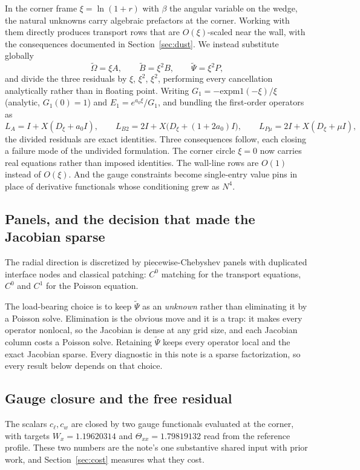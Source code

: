 \documentclass[11pt]{article}
\begin{document}
In the corner frame $\xi = \ln(1+r)$ with $\beta$ the angular variable on the wedge,
the natural unknowns carry algebraic prefactors at the corner. Working with them
directly produces transport rows that are $O(\xi)$-scaled near the wall, with the
consequences documented in Section~\ref{sec:dust}. We instead substitute globally
\[
  \tilde\Omega = \xi A, \qquad \tilde B = \xi^2 B, \qquad \tilde\Psi = \xi^2 P,
\]
and divide the three residuals by $\xi$, $\xi^2$, $\xi^2$, performing every
cancellation analytically rather than in floating point. Writing
$G_1 = -\mathrm{expm1}(-\xi)/\xi$ (analytic, $G_1(0) = 1$) and $E_1 = e^{a_0\xi}/G_1$,
and bundling the first-order operators as
\[
  L_A = I + X(D_\xi + a_0 I), \qquad
  L_{B2} = 2I + X\bigl(D_\xi + (1+2a_0)I\bigr), \qquad
  L_{P\mu} = 2I + X(D_\xi + \mu I),
\]
the divided residuals are exact identities. Three consequences follow, each closing a
failure mode of the undivided formulation. The corner circle $\xi = 0$ now carries real
equations rather than imposed identities. The wall-line rows are $O(1)$ instead of
$O(\xi)$. And the gauge constraints become single-entry value pins in place of
derivative functionals whose conditioning grew as $N^4$.

\subsection{Panels, and the decision that made the Jacobian sparse}

The radial direction is discretized by piecewise-Chebyshev panels with duplicated
interface nodes and classical patching: $C^0$ matching for the transport equations,
$C^0$ and $C^1$ for the Poisson equation.

The load-bearing choice is to keep $\tilde\Psi$ as an \emph{unknown} rather than
eliminating it by a Poisson solve. Elimination is the obvious move and it is a trap: it
makes every operator nonlocal, so the Jacobian is dense at any grid size, and each
Jacobian column costs a Poisson solve. Retaining $\tilde\Psi$ keeps every operator local
and the exact Jacobian sparse. Every diagnostic in this note is a sparse factorization,
so every result below depends on that choice.

\subsection{Gauge closure and the free residual}
\label{sec:free}

The scalars $c_\ell, c_w$ are closed by two gauge functionals evaluated at the corner,
with targets $W_x = 1.19620314$ and $\Theta_{xx} = 1.79819132$ read from the reference
profile. These two numbers are the note's one substantive shared input with prior work,
and Section~\ref{sec:cost} measures what they cost.
\end{document}
